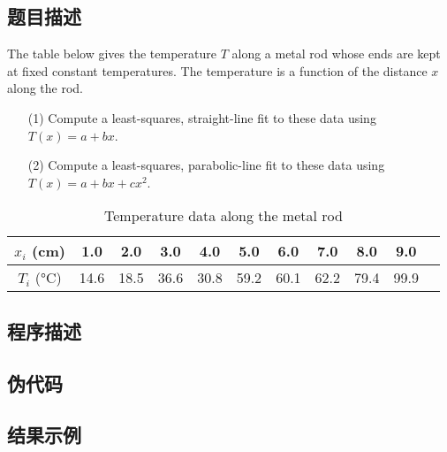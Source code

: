 \subsection{题目描述}
\noindent The table below gives the temperature \( T \) along a metal rod whose ends are kept at fixed constant temperatures. The temperature is a function of the distance \( x \) along the rod.
\begin{itemize}
    \item[(1)] Compute a least-squares, straight-line fit to these data using \( T(x) = a + bx \).
    \item[(2)] Compute a least-squares, parabolic-line fit to these data using \( T(x) = a + bx + cx^2 \).
\end{itemize}


\begin{table}[H]
    \centering
    \caption{Temperature data along the metal rod}
    \begin{tabular}{@{}ccccccccccc@{}}
        \toprule
        \(x_i\) (cm) & 1.0 & 2.0 & 3.0 & 4.0 & 5.0 & 6.0 & 7.0 & 8.0 & 9.0 \\ 
        \midrule
        \(T_i\) (°C) & 14.6 & 18.5 & 36.6 & 30.8 & 59.2 & 60.1 & 62.2 & 79.4 & 99.9 \\ 
        \bottomrule
    \end{tabular}
\end{table}

\subsection{程序描述}


\subsection{伪代码}



\subsection{结果示例}
